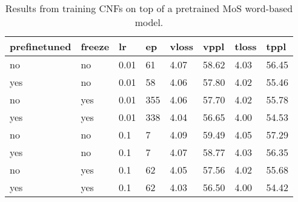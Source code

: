 \begin{table}[]
\centering
\caption{Results from training CNFs on top of a pretrained MoS word-based model.}
\begin{tabular}{|l|l|l|l|l|l|l|l|}
\hline
\textbf{prefinetuned} & \textbf{freeze} & \textbf{lr} & \textbf{ep} & \textbf{vloss} & \textbf{vppl} & \textbf{tloss} & \textbf{tppl} \\ \hline
no        & no        & 0.01      & 61        & 4.07      & 58.62     & 4.03      & 56.45 \\ \hline
yes       & no        & 0.01      & 58        & 4.06      & 57.80     & 4.02      & 55.46 \\ \hline
no        & yes       & 0.01      & 355       & 4.06      & 57.70     & 4.02      & 55.78 \\ \hline
yes       & yes       & 0.01      & 338       & 4.04      & 56.65     & 4.00      & 54.53 \\ \hline
no        & no        & 0.1       & 7         & 4.09      & 59.49     & 4.05      & 57.29 \\ \hline
yes       & no        & 0.1       & 7         & 4.07      & 58.77     & 4.03      & 56.35 \\ \hline
no        & yes       & 0.1       & 62        & 4.05      & 57.56     & 4.02      & 55.68 \\ \hline
yes       & yes       & 0.1       & 62        & 4.03      & 56.50     & 4.00      & 54.42 \\ \hline
\end{tabular}
\end{table}

